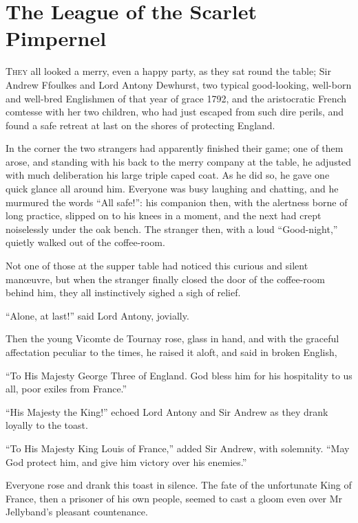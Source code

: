 
\chapter{The League of the Scarlet Pimpernel}

\lettrine[lines=4]{T}{hey} all looked a merry, even a happy party, as they sat round the table; Sir Andrew Ffoulkes and Lord Antony Dewhurst, two typical good-looking, well-born and well-bred Englishmen of that year of grace 1792, and the aristocratic French comtesse with her two children, who had just escaped from such dire perils, and found a safe retreat at last on the shores of protecting England.

In the corner the two strangers had apparently finished their game; one of them arose, and standing with his back to the merry company at the table, he adjusted with much deliberation his large triple caped coat. As he did so, he gave one quick glance all around him. Everyone was busy laughing and chatting, and he murmured the words \enquote{All safe!}: his companion then, with the alertness borne of long practice, slipped on to his knees in a moment, and the next had crept noiselessly under the oak bench. The stranger then, with a loud \enquote{Good-night,} quietly walked out of the coffee-room.

Not one of those at the supper table had noticed this curious and silent manœuvre, but when the stranger finally closed the door of the coffee-room behind him, they all instinctively sighed a sigh of relief.

\enquote{Alone, at last!} said Lord Antony, jovially.

Then the young Vicomte de Tournay rose, glass in hand, and with the graceful affectation peculiar to the times, he raised it aloft, and said in broken English,\longdash


\enquote{To His Majesty George Three of England. God bless him for his hospitality to us all, poor exiles from France.}

\enquote{His Majesty the King!} echoed Lord Antony and Sir Andrew as they drank loyally to the toast.

\enquote{To His Majesty King Louis of France,} added Sir Andrew, with solemnity. \enquote{May God protect him, and give him victory over his enemies.}

Everyone rose and drank this toast in silence. The fate of the unfortunate King of France, then a prisoner of his own people, seemed to cast a gloom even over Mr Jellyband's pleasant countenance.

